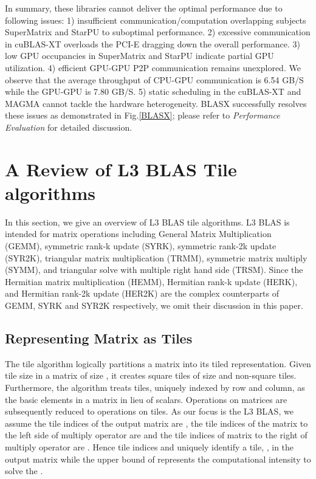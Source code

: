 \documentclass[conference]{IEEEtran}
\begin{document}
In summary, these libraries cannot deliver the optimal performance due to following issues:
1) insufficient communication/computation overlapping subjects SuperMatrix and StarPU
to suboptimal performance. 2) excessive communication in cuBLAS-XT overloads the PCI-E
dragging down the overall performance. 3) low GPU occupancies in SuperMatrix and StarPU
indicate partial GPU utilization.
4) efficient GPU-GPU P2P communication remains unexplored. We observe that the 
average throughput of CPU-GPU communication is 6.54 GB/S while the GPU-GPU is 7.80 GB/S. 
5) static scheduling in the cuBLAS-XT and MAGMA cannot tackle the hardware heterogeneity.
BLASX successfully resolves these issues as 
demonstrated in Fig.\ref{BLASX}; please refer to \textit{Performance Evaluation} for detailed 
discussion.

\vspace{-0.1in}
\section{A Review of L3 BLAS Tile algorithms}
In this section, we give an overview of L3 BLAS tile algorithms. L3 BLAS is intended for  matrix 
operations including General Matrix Multiplication (GEMM), symmetric rank-k update (SYRK), 
symmetric rank-2k update (SYR2K), triangular matrix multiplication (TRMM), symmetric matrix 
multiply (SYMM), and triangular solve with multiple right hand side (TRSM). Since the Hermitian 
matrix multiplication (HEMM), Hermitian rank-k update (HERK), and Hermitian rank-2k update 
(HER2K) are the complex counterparts of GEMM, SYRK and SYR2K respectively, we omit their 
discussion in this paper.

\vspace{-0.12in}
\subsection{Representing Matrix as Tiles}
\vspace{-0.05in}
The tile algorithm logically partitions a matrix into its tiled representation. 
Given tile size  in a matrix of size , it creates  
square tiles of size  and  non-square tiles.
Furthermore, the algorithm treats tiles, uniquely indexed by row and column, as the basic 
elements in a matrix in lieu of scalars. Operations on matrices are subsequently reduced 
to operations on tiles. As our focus is the L3 BLAS, we assume the tile indices 
of the output matrix are , the tile indices of the matrix to the left side of 
multiply operator are  and the tile indices of matrix to the right of multiply 
operator are . Hence tile indices  and  uniquely identify a tile, , 
in the output matrix while the upper bound of  represents the computational intensity to solve the .
\end{document}

